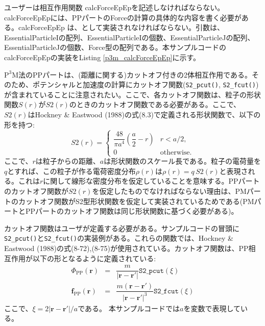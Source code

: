  \label{subsubsubsec:p3m_calcForceEpEp}
ユーザーは相互作用関数 calcForceEpEpを記述しなければならない。calcForceEpEpには、PPパートのForceの計算の具体的な内容を書く必要がある。calcForceEpEp は、\procedure {}として実装されなければならない。引数は、EssentialParticleIの配列、EssentialParticleIの個数、EssentialParticleJの配列、EssentialParticleJの個数、Force型の配列である。本サンプルコードのcalcForceEpEpの実装をListing \ref{p3m_calcForceEpEp}に示す。

\ifCpp %

\endifCpp
\ifFtn %

\endifFtn
\ifC %

\endifC

$\mathrm{P^{3}M}$法のPPパートは、(距離に関する)カットオフ付きの2体相互作用である。そのため、ポテンシャルと加速度の計算にカットオフ関数(\texttt{S2\_pcut()}, \texttt{S2\_fcut()})が含まれていることに注意されたい。ここで、各カットオフ関数は、粒子の形状関数$S(r)$が$S2(r)$のときのカットオフ関数である必要がある。ここで、$S2(r)$はHockney \& Eastwood (1988)の式(8.3)で定義される形状関数で、以下の形を持つ:
\begin{equation}
S2(r) = \left\{
\begin{array}{ll}
\dfrac{48}{\pi a^{4}}\left(\dfrac{a}{2}-r\right) & r < a/2, \\
0 & \mathrm{otherwise}.
\end{array}
\right.
\end{equation}
ここで、$r$は粒子からの距離、$a$は形状関数のスケール長である。粒子の電荷量を$q$とすれば、この粒子が作る電荷密度分布$\rho(r)$は$\rho(r)=q\,S2(r)$と表現される。これは$r$に関して線形な密度分布を仮定していることを意味する。PPパートのカットオフ関数が$S2(r)$を仮定したものでなければならない理由は、PMパートのカットオフ関数がS2型形状関数を仮定して実装されているためである(PMパートとPPパートのカットオフ関数は同じ形状関数に基づく必要がある)。

カットオフ関数はユーザが定義する必要がある。サンプルコードの冒頭に\texttt{S2\_pcut()}と\texttt{S2\_fcut()}の実装例がある。これらの関数では、Hockney \& Eastwood (1988)の式(8-72),(8-75)が使用されている。カットオフ関数は、PP相互作用が以下の形となるように定義されている:
\begin{eqnarray}
\Phi_{\mathrm{PP}}(\bm{r}) & = & \dfrac{m}{|\bm{r}-\bm{r}'|}\mathtt{S2\_pcut}(\xi) \\
\bm{f}_{\mathrm{PP}}(\bm{r}) & = & \dfrac{m(\bm{r}-\bm{r}')}{|\bm{r}-\bm{r}'|^{3}}\mathtt{S2\_fcut}(\xi)
\end{eqnarray}
ここで、$\xi = 2|\bm{r}-\bm{r}'|/a$である。
本サンプルコードでは$a$を変数で表現している。

